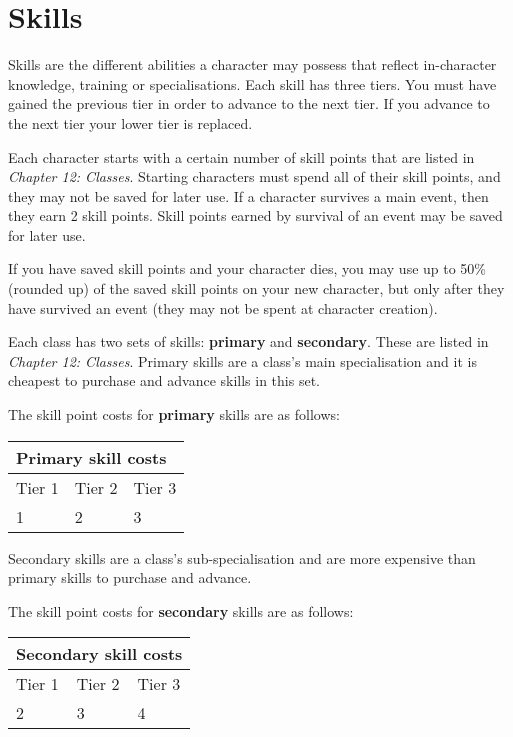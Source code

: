 \chapter{Skills}

Skills are the different abilities a character may possess that reflect in-character knowledge, training or specialisations. Each skill has three tiers. You must have gained the previous tier in order to advance to the next tier. If you advance to the next tier your lower tier is replaced.

Each character starts with a certain number of skill points that are listed in \textit{Chapter 12: Classes}. Starting characters must spend all of their skill points, and they may not be saved for later use. If a character survives a main event, then they earn 2 skill points. Skill points earned by survival of an event may be saved for later use.

If you have saved skill points and your character dies, you may use up to 50\% (rounded up) of the saved skill points on your new character, but only after they have survived an event (they may not be spent at character creation).

Each class has two sets of skills: \textbf{primary} and \textbf{secondary}. These are listed in \textit{Chapter 12: Classes}. Primary skills are a class's main specialisation and it is cheapest to purchase and advance skills in this set.

The skill point costs for \textbf{primary} skills are as follows:

\begin{table}[H]
\begin{tabular}{|l|l|l|} \hline 
\multicolumn{3}{|l|}{Primary skill costs} \\
 \hline Tier 1 & Tier 2 & Tier 3 \\
 \hline 1 & 2 & 3 \\
 \hline \end{tabular}

\end{table}

Secondary skills are a class's sub-specialisation and are more expensive than primary skills to purchase and advance.

The skill point costs for \textbf{secondary} skills are as follows:

\begin{table}[H]
\begin{tabular}{|l|l|l|} \hline 
\multicolumn{3}{|l|}{Secondary skill costs} \\
 \hline Tier 1 & Tier 2 & Tier 3 \\
 \hline 2 & 3 & 4 \\
 \hline \end{tabular}

\end{table}

